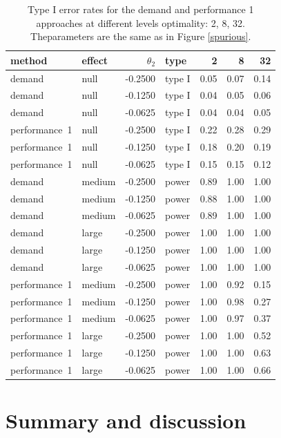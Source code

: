 \documentclass[12pt]{article}
\begin{document}
\begin{table}[ht]
\centering
\begingroup\footnotesize
\begin{tabular}{llrlrrr}
  \hline
method & effect & $\theta_2$ & type & 2 & 8 & 32 \\
  \hline
demand & null & -0.2500 & type I & 0.05 & 0.07 & 0.14 \\
  demand & null & -0.1250 & type I & 0.04 & 0.05 & 0.06 \\
  demand & null & -0.0625 & type I & 0.04 & 0.04 & 0.05 \\
  performance~1 & null & -0.2500 & type I & 0.22 & 0.28 & 0.29 \\
  performance~1 & null & -0.1250 & type I & 0.18 & 0.20 & 0.19 \\
  performance~1 & null & -0.0625 & type I & 0.15 & 0.15 & 0.12 \\
  demand & medium & -0.2500 & power & 0.89 & 1.00 & 1.00 \\
  demand & medium & -0.1250 & power & 0.88 & 1.00 & 1.00 \\
  demand & medium & -0.0625 & power & 0.89 & 1.00 & 1.00 \\
  demand & large & -0.2500 & power & 1.00 & 1.00 & 1.00 \\
  demand & large & -0.1250 & power & 1.00 & 1.00 & 1.00 \\
  demand & large & -0.0625 & power & 1.00 & 1.00 & 1.00 \\
  performance~1 & medium & -0.2500 & power & 1.00 & 0.92 & 0.15 \\
  performance~1 & medium & -0.1250 & power & 1.00 & 0.98 & 0.27 \\
  performance~1 & medium & -0.0625 & power & 1.00 & 0.97 & 0.37 \\
  performance~1 & large & -0.2500 & power & 1.00 & 1.00 & 0.52 \\
  performance~1 & large & -0.1250 & power & 1.00 & 1.00 & 0.63 \\
  performance~1 & large & -0.0625 & power & 1.00 & 1.00 & 0.66 \\
   \hline
\end{tabular}
\endgroup
\caption[Error Rate and Power with Unobserved Environmental Variables]{Type I error rates for the demand and performance 1
approaches at different levels optimality: 2, 8, 32. Theparameters are the same
as in Figure \ref{spurious}.}
\label{spurious-error}
\end{table}

\section{Summary and discussion}\label{summary-and-discussion}
\end{document}
